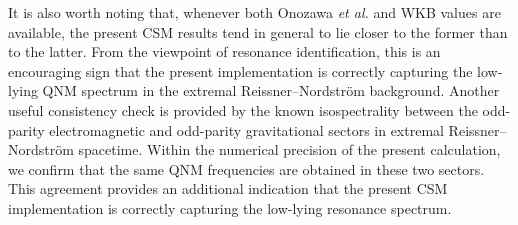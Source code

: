 It is also worth noting that, whenever both Onozawa \textit{et al.\/} and WKB values are available, the present CSM results tend in general to lie closer to the former than to the latter.
From the viewpoint of resonance identification, this is an encouraging sign that the present implementation is correctly capturing the low-lying QNM spectrum in the extremal Reissner--Nordstr\"om background.
Another useful consistency check is provided by the known isospectrality between the odd-parity electromagnetic and odd-parity gravitational sectors in extremal Reissner--Nordstr\"om spacetime.
Within the numerical precision of the present calculation, we confirm that the same QNM frequencies are obtained in these two sectors.
This agreement provides an additional indication that the present CSM implementation is correctly capturing the low-lying resonance spectrum.
